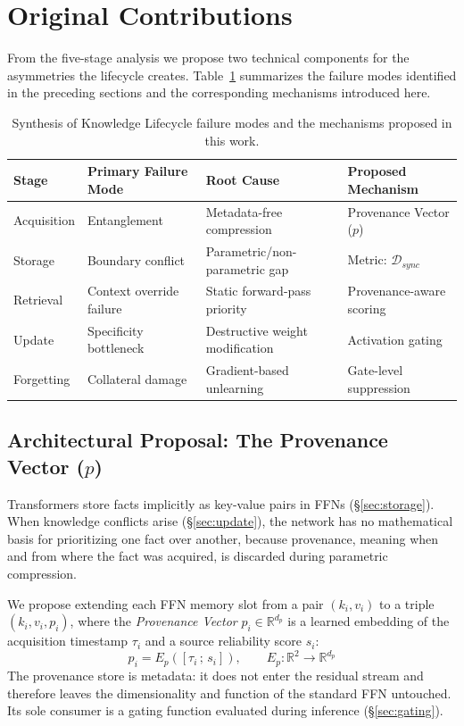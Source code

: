 \documentclass[manuscript, screen, review]{jair}
\begin{document}
\section{Original Contributions}
\label{sec:contributions}

From the five-stage analysis we propose two technical components for the asymmetries the lifecycle creates. Table~\ref{tab:synthesis} summarizes the failure modes identified in the preceding sections and the corresponding mechanisms introduced here.

\begin{table}[h]
\centering
\caption{Synthesis of Knowledge Lifecycle failure modes and the mechanisms proposed in this work.}
\label{tab:synthesis}
\small
\begin{tabular}{@{}llll@{}}
\toprule
\textbf{Stage} & \textbf{Primary Failure Mode} & \textbf{Root Cause} & \textbf{Proposed Mechanism} \\ \midrule
Acquisition & Entanglement & Metadata-free compression & Provenance Vector ($p$) \\
Storage & Boundary conflict & Parametric/non-parametric gap & Metric: $\mathcal{D}_{sync}$ \\
Retrieval & Context override failure & Static forward-pass priority & Provenance-aware scoring \\
Update & Specificity bottleneck & Destructive weight modification & Activation gating \\
Forgetting & Collateral damage & Gradient-based unlearning & Gate-level suppression \\ \bottomrule
\end{tabular}
\end{table}

\subsection{Architectural Proposal: The Provenance Vector (\texorpdfstring{$p$}{p})}
\label{sec:provenance}

Transformers store facts implicitly as key-value pairs in FFNs (\S\ref{sec:storage}). When knowledge conflicts arise (\S\ref{sec:update}), the network has no mathematical basis for prioritizing one fact over another, because provenance, meaning when and from where the fact was acquired, is discarded during parametric compression.

We propose extending each FFN memory slot from a pair $(k_i, v_i)$ to a triple $(k_i, v_i, p_i)$, where the \textit{Provenance Vector} $p_i \in \mathbb{R}^{d_p}$ is a learned embedding of the acquisition timestamp $\tau_i$ and a source reliability score $s_i$:
\begin{equation}
  p_i = E_p([\tau_i \,;\, s_i]), \qquad E_p : \mathbb{R}^2 \to \mathbb{R}^{d_p}
\end{equation}
The provenance store is metadata: it does not enter the residual stream and therefore leaves the dimensionality and function of the standard FFN untouched. Its sole consumer is a gating function evaluated during inference (\S\ref{sec:gating}).
\end{document}
